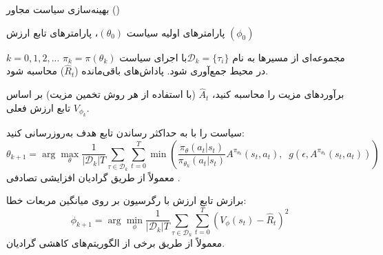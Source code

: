 \vspace{1cm}
\begin{algorithm}[H]
\caption{
	بهینه‌سازی سیاست مجاور  ()
	}\label{alg:PPO}
\begin{algorithmic}[1]
پارامترهای اولیه سیاست
$(\theta_0)$، پارامترهای تابع ارزش
$(\phi_0)$

\For $k = 0,1,2,...$
	\State 
	مجموعه‌ای از مسیرها به نام
	 ${\mathcal D}_k = \{\tau_i\}$ 
		​	
	 با اجرای سیاست 
	 $\pi_k = \pi(\theta_k)$
	 در محیط جمع‌آوری شود.
	\State
	 پاداش‌های باقی‌مانده 
	 ($\hat{R}_t$)
	 محاسبه شود.

	    \State \parbox[t]{\dimexpr\linewidth-\algorithmicindent}{
	برآوردهای مزیت را محاسبه کنید، $\hat{A}_t$ (با استفاده از هر روش تخمین مزیت) بر اساس تابع ارزش فعلی $V_{\phi_k}$.
	    	\strut}
	
	
	     \State \parbox[t]{\dimexpr\linewidth-\algorithmicindent}{
	     	سیاست را با به حداکثر رساندن تابع هدف  به‌روزرسانی کنید:
	     	\begin{equation*} \theta_{k+1} = \arg \max_{\theta} \frac{1}{|{\mathcal D}_k| T} \sum_{\tau \in {\mathcal D}_k} \sum_{t=0}^T \min\left( \frac{\pi_{\theta}(a_t|s_t)}{\pi_{\theta_k}(a_t|s_t)} A^{\pi_{\theta_k}}(s_t,a_t), \;\; g(\epsilon, A^{\pi_{\theta_k}}(s_t,a_t)) \right) \end{equation*}
	     	معمولاً از طریق گرادیان افزایشی تصادفی .
	     	\strut}
	 
	 \State
	 برازش تابع ارزش با رگرسیون بر روی میانگین مربعات خطا:
	 \begin{equation*} \phi_{k+1} = \arg \min_{\phi} \frac{1}{|{\mathcal D}_k| T} \sum_{\tau \in {\mathcal D}_k} \sum_{t=0}^T\left( V_{\phi} (s_t) - \hat{R}_t \right)^2 \end{equation*} 
	 معمولاً از طریق برخی از الگوریتم‌های کاهشی گرادیان.
\EndFor
\end{algorithmic}
\end{algorithm}














